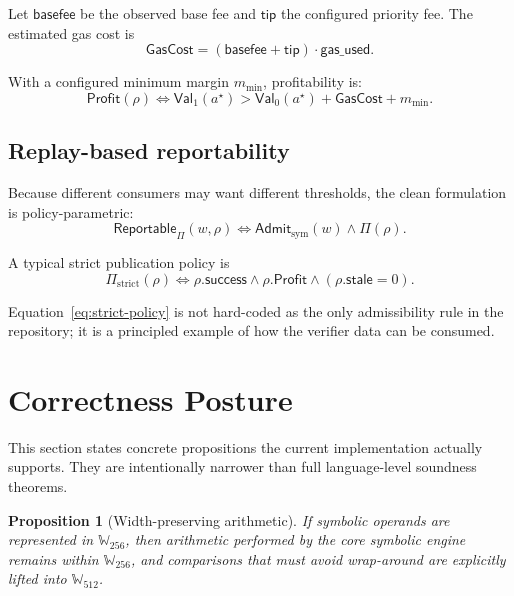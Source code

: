 \documentclass[11pt]{article}
\numberwithin{equation}{section}
\newtheorem{proposition}[definition]{Proposition}
\theoremstyle{remark}
\newcommand{\Words}[1]{\mathbb{W}_{#1}}
\newcommand{\Reportable}{\mathsf{Reportable}}
\newcommand{\Val}{\mathsf{Val}}
\newcommand{\Profit}{\mathsf{Profit}}
\begin{document}
Let \(\mathsf{basefee}\) be the observed base fee and \(\mathsf{tip}\) the configured priority fee. The estimated gas cost is
\begin{equation}
\label{eq:gas-cost}
\mathsf{GasCost} = (\mathsf{basefee} + \mathsf{tip}) \cdot \mathsf{gas\_used}.
\end{equation}

With a configured minimum margin \(m_{\min}\), profitability is:
\begin{equation}
\label{eq:profitability}
\Profit(\rho)
\Longleftrightarrow
\Val_1(a^\star)
>
\Val_0(a^\star)
+
\mathsf{GasCost}
+
m_{\min}.
\end{equation}

\subsection{Replay-based reportability}

Because different consumers may want different thresholds, the clean formulation is policy-parametric:
\begin{equation}
\label{eq:reportable}
\Reportable_{\Pi}(w,\rho)
\Longleftrightarrow
\mathsf{Admit}_{\mathrm{sym}}(w)
\land
\Pi(\rho).
\end{equation}

A typical strict publication policy is
\begin{equation}
\label{eq:strict-policy}
\Pi_{\mathrm{strict}}(\rho)
\Longleftrightarrow
\rho.\mathsf{success}
\land
\rho.\Profit
\land
(\rho.\mathsf{stale} = 0).
\end{equation}

Equation~\eqref{eq:strict-policy} is not hard-coded as the only admissibility rule in the repository; it is a principled example of how the verifier data can be consumed.

\section{Correctness Posture}
\label{sec:correctness}

This section states concrete propositions the current implementation actually supports. They are intentionally narrower than full language-level soundness theorems.

\begin{proposition}[Width-preserving arithmetic]
\label{prop:width}
If symbolic operands are represented in \(\Words{256}\), then arithmetic performed by the core symbolic engine remains within \(\Words{256}\), and comparisons that must avoid wrap-around are explicitly lifted into \(\Words{512}\).
\end{proposition}
\end{document}
